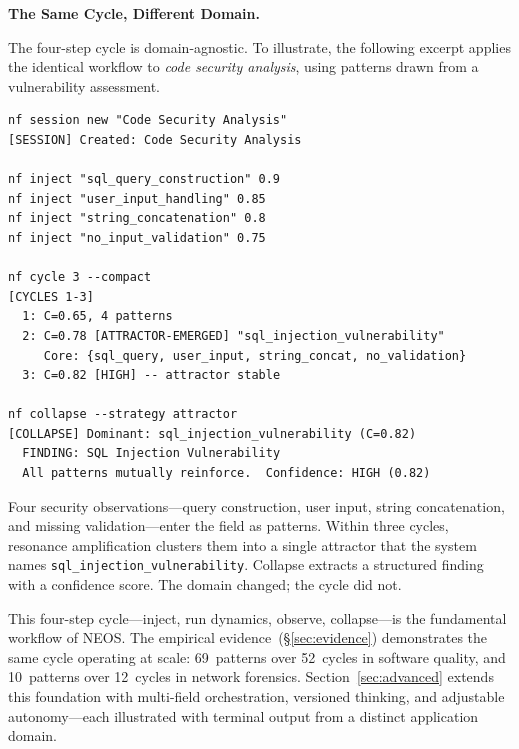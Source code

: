 \bigskip\noindent\textbf{The Same Cycle, Different Domain.}
\nopagebreak[4]\smallskip

\noindent
The four-step cycle is domain-agnostic.  To illustrate, the following
excerpt applies the identical workflow to \emph{code security analysis},
using patterns drawn from a vulnerability assessment.

\begin{terminalbox}
\begin{lstlisting}[style=neosshell]
nf session new "Code Security Analysis"
[SESSION] Created: Code Security Analysis

nf inject "sql_query_construction" 0.9
nf inject "user_input_handling" 0.85
nf inject "string_concatenation" 0.8
nf inject "no_input_validation" 0.75

nf cycle 3 --compact
[CYCLES 1-3]
  1: C=0.65, 4 patterns
  2: C=0.78 [ATTRACTOR-EMERGED] "sql_injection_vulnerability"
     Core: {sql_query, user_input, string_concat, no_validation}
  3: C=0.82 [HIGH] -- attractor stable

nf collapse --strategy attractor
[COLLAPSE] Dominant: sql_injection_vulnerability (C=0.82)
  FINDING: SQL Injection Vulnerability
  All patterns mutually reinforce.  Confidence: HIGH (0.82)
\end{lstlisting}
\end{terminalbox}

\noindent
Four security observations---query construction, user input, string
concatenation, and missing validation---enter the field as patterns.
Within three cycles, resonance amplification clusters them into a single
attractor that the system names \texttt{sql\_injection\_vulnerability}.
Collapse extracts a structured finding with a confidence score.  The
domain changed; the cycle did not.

\medskip
\noindent
This four-step cycle---inject, run dynamics, observe, collapse---is the
fundamental workflow of NEOS.  The empirical
evidence~(\S\ref{sec:evidence}) demonstrates the same cycle operating
at scale: 69~patterns over 52~cycles in software quality, and
10~patterns over 12~cycles in network forensics.
Section~\ref{sec:advanced} extends this foundation with multi-field
orchestration, versioned thinking, and adjustable autonomy---each
illustrated with terminal output from a distinct application domain.
